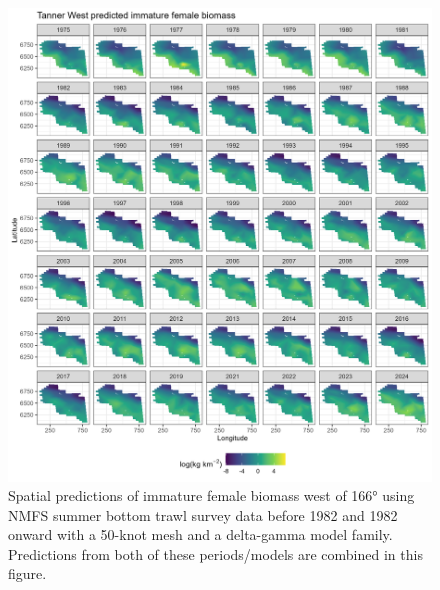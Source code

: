 \documentclass[
]{article}
\begin{document}
\begin{figure}

{\centering \includegraphics[width=1\linewidth,height=1\textheight]{../BAIRDI/Figures/TannerW_imfem_spatbio} 

}

\caption{Spatial predictions of immature female biomass west of 166° using NMFS summer bottom trawl survey data before 1982 and 1982 onward with a 50-knot mesh and a delta-gamma model family. Predictions from both of these periods/models are combined in this figure.}\label{fig:spatpred-bio-50-imfemW}
\end{figure}
\end{document}
